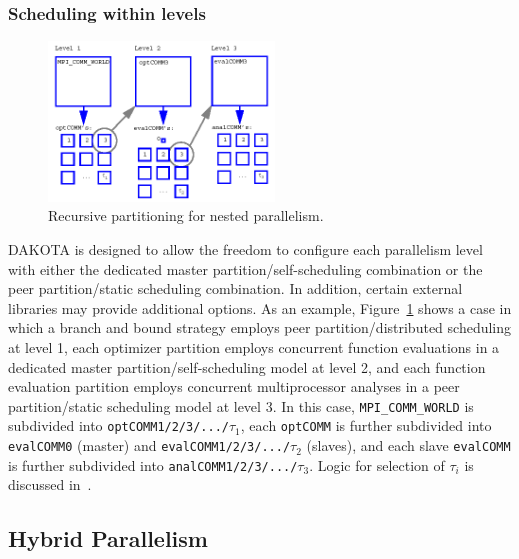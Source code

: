 \subsubsection{Scheduling within levels}\label{parallel:MLP:message:scheduling}

\begin{figure}[ht]
  \centering
  \includegraphics[width=60mm]{images/recursive_partitioning}
  \caption{Recursive partitioning for nested parallelism.}
  \label{parallel:figure02}
\end{figure}

DAKOTA is designed to allow the freedom to configure each parallelism
level with either the dedicated master partition/self-scheduling
combination or the peer partition/static scheduling combination. In
addition, certain external libraries may provide additional options.
As an
example, Figure~\ref{parallel:figure02} shows a case in which a branch
and bound strategy employs peer partition/distributed scheduling at
level 1, each optimizer partition employs concurrent function
evaluations in a dedicated master partition/self-scheduling model at
level 2, and each function evaluation partition employs concurrent
multiprocessor analyses in a peer partition/static scheduling model at
level 3. In this case, \texttt{MPI\_COMM\_WORLD} is subdivided into
\texttt{optCOMM1/2/3/.../$\tau_{1}$}, each \texttt{optCOMM} is further
subdivided into \texttt{evalCOMM0} (master) and
\texttt{evalCOMM1/2/3/.../$\tau_{2}$} (slaves), and each slave
\texttt{evalCOMM} is further subdivided into
\texttt{analCOMM1/2/3/.../$\tau_{3}$}.  Logic for selection of $\tau_i$
is discussed in~\cite{Eld00}.


\subsection{Hybrid Parallelism}\label{parallel:MLP:hybrid}


